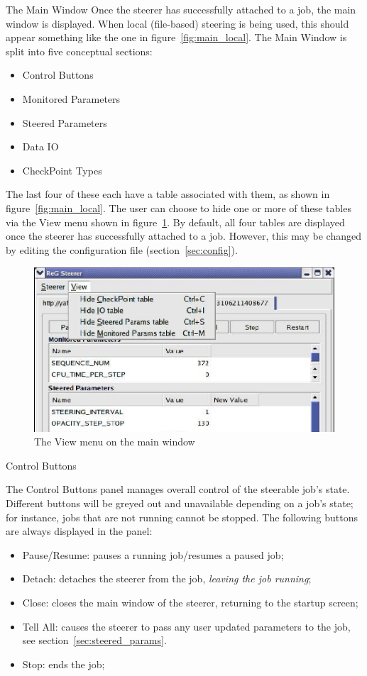 \documentclass[a4paper,twoside]{article}
\begin{document}
\begin{section}{The Main Window}
Once the steerer has successfully attached to a job, the main window
is displayed.  When local (file-based) steering is being used, this
should appear something like the one in figure~\ref{fig:main_local}.
The Main Window is split into five conceptual sections:
\begin{itemize}
\item Control Buttons
\item Monitored Parameters
\item Steered Parameters
\item Data IO
\item CheckPoint Types
\end{itemize}
The last four of these each have a table associated with them, as
shown in figure~\ref{fig:main_local}.  The user can choose to hide one
or more of these tables via the View menu shown in
figure~\ref{fig:view_menu}.  By default, all four tables are displayed
once the steerer has successfully attached to a job.  However, this
may be changed by editing the configuration file
(section~\ref{sec:config}).

\begin{figure}
\centerline{\includegraphics{main_view_menu.eps}}
\caption{The View menu on the main window}
\label{fig:view_menu}
\end{figure}


\begin{subsection}{Control Buttons}
\label{sec:control_btns}

The Control Buttons panel manages overall control of the steerable
job's state. Different buttons will be greyed out and unavailable
depending on a job's state; for instance, jobs that are not running
cannot be stopped.  The following buttons are always displayed in the
panel:
\begin{itemize}
\item Pause/Resume: pauses a running job/resumes a paused job;
\item Detach: detaches the steerer from the job, \textit{leaving the 
job running};
\item Close: closes the main window of the steerer, returning to the 
startup screen;
\item Tell All: causes the steerer to pass any user updated 
parameters to the job, see section~\ref{sec:steered_params}.
\item Stop: ends the job;
\end{itemize}


\end{subsection}
\end{section}
\end{document}
